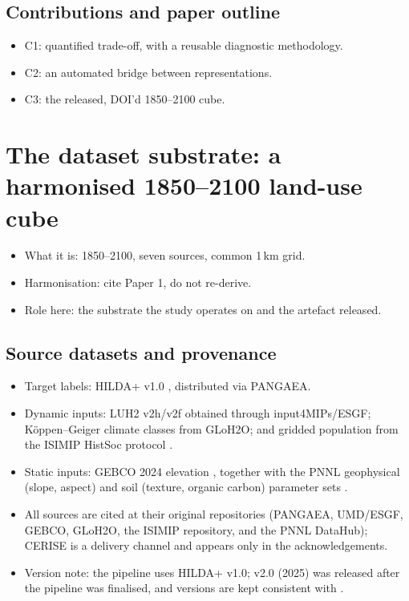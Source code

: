 \documentclass[gmd, manuscript]{copernicus}
\begin{document}
\subsection{Contributions and paper outline}
\begin{itemize}
\item C1: quantified trade-off, with a reusable diagnostic methodology.
\item C2: an automated bridge between representations.
\item C3: the released, DOI'd 1850--2100 cube.
\end{itemize}

\section{The dataset substrate: a harmonised 1850--2100 land-use cube}
\begin{itemize}
\item What it is: 1850--2100, seven sources, common 1\,km grid.
\item Harmonisation: cite Paper 1, do not re-derive.
\item Role here: the substrate the study operates on and the artefact released.
\end{itemize}

\subsection{Source datasets and provenance}
\begin{itemize}
\item Target labels: HILDA+ v1.0 \citep{winkler2020hilda+}, distributed via PANGAEA.
\item Dynamic inputs: LUH2 v2h/v2f \citep{hurtt2020harmonization} obtained through input4MIPs/ESGF;
      K{\"o}ppen--Geiger climate classes \citep{beck2018present, beck2023high} from GLoH2O;
      and gridded population from the ISIMIP HistSoc protocol \citep{frieler2017assessing}.
\item Static inputs: GEBCO 2024 elevation \citep{GEBCO2024}, together with the PNNL geophysical
      (slope, aspect) and soil (texture, organic carbon) parameter sets \citep{li2024global}.
\item All sources are cited at their original repositories (PANGAEA, UMD/ESGF, GEBCO, GLoH2O,
      the ISIMIP repository, and the PNNL DataHub); CERISE is a delivery channel and appears
      only in the acknowledgements.
\item Version note: the pipeline uses HILDA+ v1.0; v2.0 (2025) was released after the pipeline
      was finalised, and versions are kept consistent with \citet{mozaffari2026scalable}.
\end{itemize}
\end{document}

